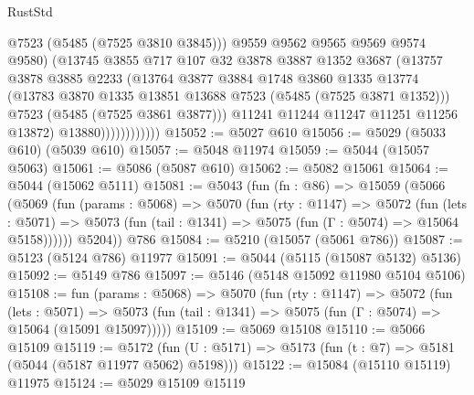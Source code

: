\begin{lexlean}{RustStd}
\begin{coremodule}
                              @7523
                              (@5485 (@7525 @3810 @3845)))
                            @9559
                            @9562
                            @9565
                            @9569
                            @9574
                            @9580)
                          (@13745
                            @3855
                            @717
                            @107
                            @32
                            @3878
                            @3887
                            @1352
                            @3687
                            (@13757
                              @3878
                              @3885
                              @2233
                              (@13764
                                @3877
                                @3884
                                @1748
                                @3860
                                @1335
                                @13774
                                (@13783 @3870 @1335 @13851 @13688 @7523 (@5485 (@7525 @3871 @1352)))
                                @7523
                                (@5485 (@7525 @3861 @3877)))
                              @11241
                              @11244
                              @11247
                              @11251
                              @11256
                              @13872)
                            @13880))))))))))))
@15052 := @5027 @610
@15056 := @5029 (@5033 @610) (@5039 @610)
@15057 := @5048 @11974
@15059 := @5044 (@15057 @5063)
@15061 := @5086 (@5087 @610)
@15062 := @5082 @15061
@15064 := @5044 (@15062 @5111)
@15081 := @5043
    (fun (fn : @86) =>
    @15059
      (@5066
        (@5069
          (fun (params : @5068) =>
          @5070
            (fun (rty : @1147) =>
            @5072
              (fun (lets : @5071) =>
              @5073 (fun (tail : @1341) => @5075 (fun (Γ : @5074) => @15064 @5158))))))
        @5204))
    @786
@15084 := @5210 (@15057 (@5061 @786))
@15087 := @5123 (@5124 @786) @11977
@15091 := @5044 (@5115 (@15087 @5132) @5136)
@15092 := @5149 @786
@15097 := @5146 (@5148 @15092 @11980 @5104 @5106)
@15108 := fun (params : @5068) =>
  @5070
    (fun (rty : @1147) =>
    @5072
      (fun (lets : @5071) =>
      @5073 (fun (tail : @1341) => @5075 (fun (Γ : @5074) => @15064 (@15091 @15097)))))
@15109 := @5069 @15108
@15110 := @5066 @15109
@15119 := @5172
    (fun (U : @5171) => @5173 (fun (t : @7) => @5181 (@5044 (@5187 @11977 @5062) @5198)))
@15122 := @15084 (@15110 @15119) @11975
@15124 := @5029 @15109 @15119

\end{coremodule}
\end{lexlean}
